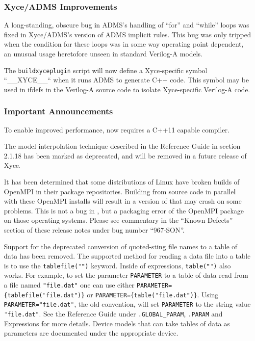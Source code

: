 \documentclass[letterpaper]{scrartcl}
\begin{document}
\subsubsection*{Xyce/ADMS Improvements}
\begin{XyceItemize}
  \item A long-standing, obscure bug in ADMS's handling of ``for'' and
    ``while'' loops was fixed in Xyce/ADMS's version of ADMS implicit
    rules.  This bug was only tripped when the condition for these
    loops was in some way operating point dependent, an unusual usage
    heretofore unseen in standard Verilog-A models.
  \item The \texttt{buildxyceplugin} script will now define a
    Xyce-specific symbol ``\_\_XYCE\_\_`` when it runs ADMS to
    generate C++ code.  This symbol may be used in ifdefs in the
    Verilog-A source code to isolate Xyce-specific Verilog-A code.
\end{XyceItemize}

\subsubsection*{Important Announcements}
\begin{XyceItemize}
\item To enable improved performance, \Xyce{} now requires a C++11
  capable compiler.
\item The model interpolation technique described in the \Xyce{}
  Reference Guide in section 2.1.18 has been marked as deprecated, and
  will be removed in a future release of Xyce.
\item It has been determined that some distributions of Linux have
  broken builds of OpenMPI in their package repositories.  Building
  \Xyce{} from source code in parallel with these OpenMPI installs
  will result in a version of \Xyce{} that may crash on some problems.
  This is not a bug in \Xyce{}, but a packaging error of the OpenMPI
  package on those operating systems.  Please see commentary in the
  ``Known Defects'' section of these release notes under bug number
  ``967-SON''.
 \item Support for the deprecated conversion of quoted-sting file
   names to a table of data has been removed.  The supported method
   for reading a data file into a table is to use the
   \texttt{tablefile("")} keyword.  Inside of expressions,
   \texttt{table("")} also works.  For example, to set the parameter
   \texttt{PARAMETER} to a table of data read from a file named
   \texttt{"file.dat"} one can use either
   \texttt{PARAMETER=\{tablefile("file.dat")\}} or
   \texttt{PARAMETER=\{table("file.dat")\}}.  Using
   \texttt{PARAMETER="file.dat"}, the old convention, will set
   \texttt{PARAMETER} to the string value \texttt{"file.dat"}.  See
   the \Xyce{} Reference Guide under \texttt{.GLOBAL\_PARAM},
   \texttt{.PARAM} and Expressions for more details.  Device models
   that can take tables of data as parameters are documented under the
   appropriate device.
\end{XyceItemize}
\end{document}
